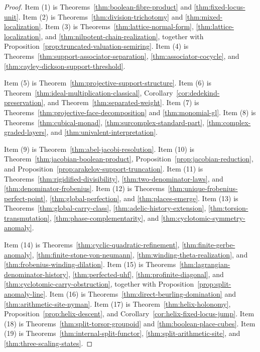 \documentclass[11pt]{amsart}
\numberwithin{equation}{section}
\theoremstyle{definition}
\begin{document}
\begin{proof}
Item (1) is Theorems~\ref{thm:boolean-fibre-product} and
\ref{thm:fixed-locus-unit}.  Item (2) is
Theorems~\ref{thm:division-trichotomy} and
\ref{thm:mixed-localization}.  Item (3) is
Theorems~\ref{thm:lattice-normal-form},
\ref{thm:lattice-localization}, and
\ref{thm:nilpotent-chain-realization}, together with
Proposition~\ref{prop:truncated-valuation-semiring}.  Item (4) is
Theorems~\ref{thm:support-associator-separation},
\ref{thm:associator-cocycle}, and
\ref{thm:cayley-dickson-support-threshold}.

Item (5) is Theorem~\ref{thm:projective-support-structure}.  Item (6) is
Theorem~\ref{thm:ideal-multiplication-classical},
Corollary~\ref{cor:dedekind-preservation}, and
Theorem~\ref{thm:separated-weight}.  Item (7) is
Theorems~\ref{thm:projective-face-decomposition} and
\ref{thm:monomial-gl}.  Item (8) is
Theorems~\ref{thm:cubical-monad},
\ref{thm:surcomplex-standard-part},
\ref{thm:complex-graded-layers}, and
\ref{thm:univalent-interpretation}.

Item (9) is Theorem~\ref{thm:abel-jacobi-resolution}.  Item (10) is
Theorem~\ref{thm:jacobian-boolean-product},
Proposition~\ref{prop:jacobian-reduction}, and
Proposition~\ref{prop:arakelov-support-truncation}.  Item (11) is
Theorems~\ref{thm:rigidified-divisibility},
\ref{thm:two-denominator-laws}, and
\ref{thm:denominator-frobenius}.  Item (12) is
Theorems~\ref{thm:unique-frobenius-perfect-point},
\ref{thm:global-perfection}, and \ref{thm:places-emerge}.  Item (13) is
Theorems~\ref{thm:global-carry-class},
\ref{thm:adelic-history-extension},
\ref{thm:torsion-transmutation},
\ref{thm:phase-complementarity}, and
\ref{thm:cyclotomic-symmetry-anomaly}.

Item (14) is Theorems~\ref{thm:cyclic-quadratic-refinement},
\ref{thm:finite-gerbe-anomaly},
\ref{thm:finite-stone-von-neumann},
\ref{thm:winding-theta-realization}, and
\ref{thm:frobenius-winding-dilation}.  Item (15) is
Theorems~\ref{thm:lagrangian-denominator-history},
\ref{thm:perfected-uhf}, \ref{thm:profinite-diagonal}, and
\ref{thm:cyclotomic-carry-obstruction}, together with
Proposition~\ref{prop:split-anomaly-line}.  Item (16) is
Theorems~\ref{thm:direct-beurling-domination} and
\ref{thm:arithmetic-site-nyman}.  Item (17) is
Theorem~\ref{thm:helix-holonomy},
Proposition~\ref{prop:helix-descent}, and
Corollary~\ref{cor:helix-fixed-locus-jump}.  Item (18) is
Theorems~\ref{thm:split-torsor-groupoid} and
\ref{thm:boolean-place-cubes}.  Item (19) is
Theorems~\ref{thm:internal-split-functor},
\ref{thm:split-arithmetic-site}, and
\ref{thm:three-scaling-states}.
\end{proof}
\end{document}
